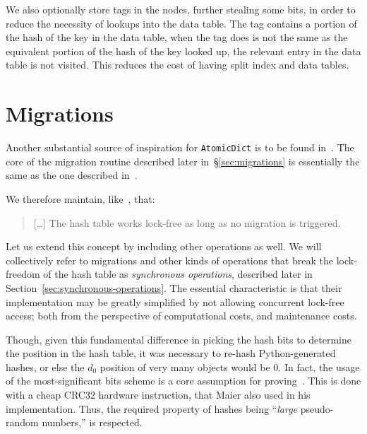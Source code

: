 We also optionally store tags in the nodes, further stealing some bits, in order to reduce the necessity of lookups into the data table.
The tag contains a portion of the hash of the key in the data table, when the tag does is not the same as the equivalent portion of the hash of the key looked up, the relevant entry in the data table is not visited.
This reduces the cost of having split index and data tables.


\section{Migrations}\label{sec:migrations-design}

Another substantial source of inspiration for \texttt{AtomicDict} is to be found in~\cite{maier}.
The core of the migration routine described later in~\S\ref{sec:migrations} is essentially the same as the one described in~\cite[\S5.3]{maier}.

We therefore maintain, like~\cite{maier}, that:

\begin{quote}
	[\ldots] The hash table works lock-free as long as no migration is triggered.
\end{quote}

Let us extend this concept by including other operations as well.
We will collectively refer to migrations and other kinds of operations that break the lock-freedom of the hash table as \emph{synchronous operations}, described later in Section~\ref{sec:synchronous-operations}.
The essential characteristic is that their implementation may be greatly simplified by not allowing concurrent lock-free access; both from the perspective of computational costs, and maintenance costs.

Though, given this fundamental difference in picking the hash bits to determine the position in the hash table, it was necessary to re-hash Python-generated hashes, or else the $d_0$ position of very many objects would be $0$.
In fact, the usage of the most-significant bits scheme is a core assumption for proving~\cite[Lemma~5.1]{maier}.
This is done with a cheap CRC32 hardware instruction, that Maier also used in his implementation.
Thus, the required property of hashes being ``\emph{large} pseudo-random numbers,'' is respected.


